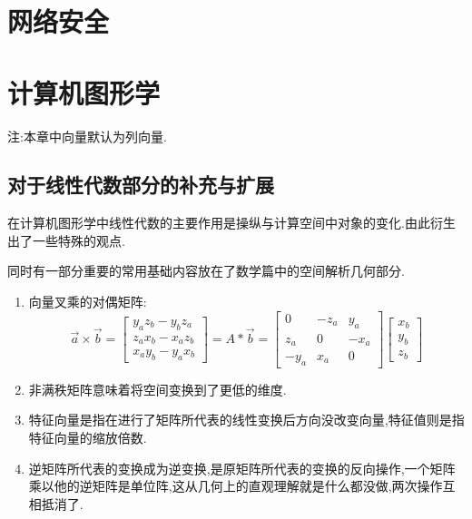 \documentclass[UTF8,12pt]{ctexbook}
\begin{document}
{{{   }%

  \section{网络安全}{


   }%

  \section{计算机图形学}{
    注:本章中向量默认为列向量.

    \subsection{对于线性代数部分的补充与扩展}{

      在计算机图形学中线性代数的主要作用是操纵与计算空间中对象的变化.由此衍生出了一些特殊的观点.

      同时有一部分重要的常用基础内容放在了数学篇中的空间解析几何部分.

      \begin{enumerate}
        \item {向量叉乘的对偶矩阵:
              $$\vec{a} \times \vec{b}
                =
                \begin{bmatrix}
                  y_az_b - y_bz_a \\
                  z_ax_b - x_az_b \\
                  x_ay_b - y_ax_b
                \end{bmatrix}
                =
                A * \vec{b}
                =
                \begin{bmatrix}
                  0    & -z_a & y_a  \\
                  z_a  & 0    & -x_a \\
                  -y_a & x_a  & 0
                \end{bmatrix}
                \begin{bmatrix}
                  x_b \\
                  y_b \\
                  z_b
                \end{bmatrix}
              $$
              }
        \item 非满秩矩阵意味着将空间变换到了更低的维度.
        \item 特征向量是指在进行了矩阵所代表的线性变换后方向没改变向量,特征值则是指特征向量的缩放倍数.
        \item 逆矩阵所代表的变换成为逆变换,是原矩阵所代表的变换的反向操作,一个矩阵乘以他的逆矩阵是单位阵,这从几何上的直观理解就是什么都没做,两次操作互相抵消了.
      \end{enumerate}
    }

}}}
\end{document}
